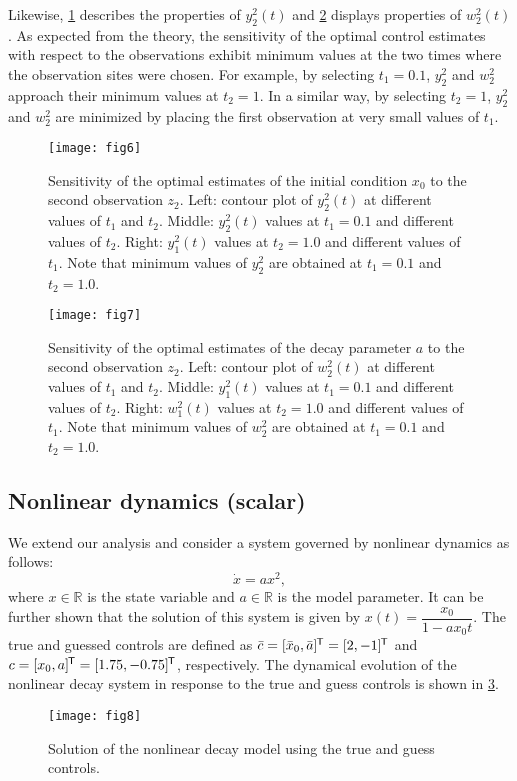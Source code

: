 \documentclass{article}
\newcommand*{\tran}{^{\mkern-1.5mu\mathsf{T}}}
\begin{document}
Likewise, \cref{fig:y2} describes the properties of $y_2^2(t)$ and \cref{fig:w2} displays properties of $w_2^2(t)$. As expected from the theory, the sensitivity of the optimal control estimates with respect to the observations exhibit minimum values at the two times where the observation sites were chosen. For example, by selecting $t_1=0.1$, $y_2^2$ and $w_2^2$ approach their minimum values at $t_2=1$. In a similar way, by selecting $t_2=1$, $y_2^2$ and $w_2^2$ are minimized by placing the first observation at very small values of $t_1$.

\begin{figure}[ht!]
    \centering
    \texttt{[image: fig6]}
    \caption{Sensitivity of the optimal estimates of the initial condition $x_0$ to the second observation $z_2$. Left: contour plot of $y_2^2(t)$ at different values of $t_1$ and $t_2$. Middle: $y_2^2(t)$ values at $t_1=0.1$ and different values of $t_2$. Right: $y_1^2(t)$ values at $t_2=1.0$ and different values of $t_1$. Note that minimum values of $y_2^2$ are obtained at $t_1=0.1$ and $t_2=1.0$.}
    \label{fig:y2}
\end{figure}

\begin{figure}[ht!]
    \centering
    \texttt{[image: fig7]}
    \caption{Sensitivity of the optimal estimates of the decay parameter $a$ to the second observation $z_2$. Left: contour plot of $w_2^2(t)$ at different values of $t_1$ and $t_2$. Middle: $y_1^2(t)$ values at $t_1=0.1$ and different values of $t_2$. Right: $w_1^2(t)$ values at $t_2=1.0$ and different values of $t_1$. Note that minimum values of $w_2^2$ are obtained at $t_1=0.1$ and $t_2=1.0$.}
    \label{fig:w2}
\end{figure}

\subsection{Nonlinear dynamics (scalar)}
We extend our analysis and consider a system governed by nonlinear dynamics as follows:
\begin{equation}
    \dot{x} = a x^2,
\end{equation}
where $x \in \mathbb{R}$ is the state variable and $a \in \mathbb{R}$ is the model parameter. It can be further shown that the solution of this system is given by $x(t) = \dfrac{x_0}{1-a x_0 t}$. The true and guessed controls are defined as $\bar{c}=[\bar{x}_0, \bar{a}]\tran = [2,-1]\tran$ and $c=[x_0, a]\tran = [1.75,-0.75]\tran$, respectively. The dynamical evolution of the nonlinear decay system in response to the true and guess controls is shown in \cref{fig:xtruenon}.
\begin{figure}[ht!]
    \centering
    \texttt{[image: fig8]}
    \caption{Solution of the nonlinear decay model using the true and guess controls.}
    \label{fig:xtruenon}
\end{figure}
\end{document}
